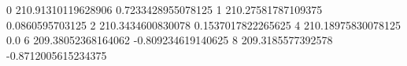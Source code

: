 0 210.91310119628906 0.7233428955078125
1 210.27581787109375 0.0860595703125
2 210.3434600830078 0.1537017822265625
4 210.18975830078125 0.0
6 209.38052368164062 -0.809234619140625
8 209.3185577392578 -0.8712005615234375
